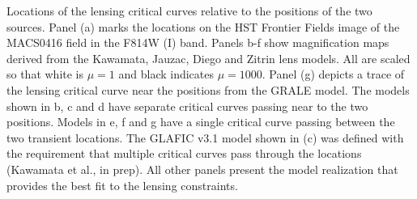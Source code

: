 \label{fig:SpockCriticalCurves}
Locations of the lensing critical curves relative to the positions of
the two \spock sources. Panel (a) marks the \spock locations on the
HST Frontier Fields image of the MACS0416 field in the F814W (I) band.
Panels b-f show magnification maps derived from the Kawamata, Jauzac,
Diego and Zitrin lens models.  All are scaled so that white is $\mu=1$
and black indicates $\mu=1000$.  Panel (g) depicts a trace of the
lensing critical curve near the \spock positions from the GRALE
model. The models shown in b, c and d have separate critical curves
passing near to the two \spock positions. Models in e, f and g have a
single critical curve passing between the two transient locations.
The GLAFIC v3.1 model shown in (c) was defined with the requirement
that multiple critical curves pass through the \spock locations
(Kawamata et al., in prep).  All other panels present the model
realization that provides the best fit to the lensing constraints.
